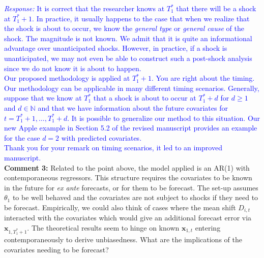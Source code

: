 \documentclass[12pt]{article}
\newcommand{\response}[1]{\noindent \textcolor{blue}{\emph{Response:} #1}}
\begin{document}
\response{It is correct that the researcher knows at $T_1^*$ that there will be a shock at $T_1^* + 1$. In practice, it usually happens to the case that when we realize that the shock is about to occur, we  know the \emph{general type}  or \emph{general cause} of the shock. The magnitude is not known. 
We admit that it is quite an informational advantage over unanticipated shocks. However, in practice, if a shock is unanticipated, we may not even be able to construct such a post-shock analysis since we do not know it is about to happen.\\

Our proposed methodology is applied at $T_1^*+1$. You are right about the timing. Our methodology can be applicable in many different timing scenarios. Generally, suppose that we know at $T_1^*$ that a shock is about to occur at $T_1^* + d$ for $d\geq 1$ and $d\in \mathbb{N}$ and that we have information about the future covariates for $t = T_1^* +1 , \ldots, T_1^* + d$. It is possible to generalize our method to this situation. Our new Apple example in Section 5.2 of the revised manuscript provides an example for the case $d=2$ with predicted covariates. \\

Thank you for your remark on timing scenarios, it led to an improved manuscript.} \\

{\bf Comment 3:} Related to the point above, the model applied is an AR(1) with contemporaneous regressors. This structure requires the covariates to be known in the future for \emph{ex ante} forecasts, or for them to be forecast. The set-up assumes $\theta_1$ to be well behaved and the covariates are not subject to shocks if they need to be forecast. Empirically, we could also think of cases where the mean shift $D_{i,t}$ interacted with the covariates which would give an additional forecast error via $\mathbf{x}_{1, T_1^* + 1}$. The theoretical results seem to hinge on known $\mathbf{x}_{1,t}$ entering contemporaneously to derive unbiasedness. What are the implications of the covariates needing to be forecast? \\
\end{document}
